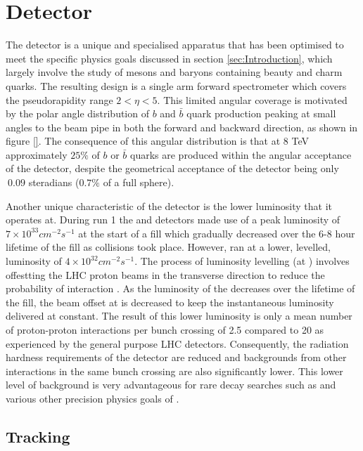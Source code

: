 
\section{Detector}
\label{sec:Detector}

The \lhcb detector is a unique and specialised apparatus that has been optimised to meet the specific physics goals discussed in section \ref{sec:Introduction}, which largely involve the study of mesons and baryons containing beauty and charm quarks.  The resulting design is a single arm forward spectrometer which covers the pseudorapidity range $2 < \eta < 5$.  This limited angular coverage is motivated by the polar angle distribution of  $b$ and $\bar{b}$ quark production peaking at small angles to the beam pipe in both the forward and backward direction, as shown in figure \ref{}.  The consequence of this angular distribution is that at 8 TeV approximately $25\%$ of $b$ or $\bar{b}$ quarks are produced within the angular acceptance of the \lhcb detector, despite the geometrical acceptance of the detector being only $~0.09$ steradians ($0.7\%$ of a full sphere).

Another unique characteristic of the \lhcb detector is the lower luminosity that it operates at.  During run 1 the \atlas and \cms detectors made use of a peak luminosity of $7\times 10^{33}cm^{-2}s^{-1}$ at the start of a fill which gradually decreased over the 6-8 hour lifetime of the fill as collisions took place.  However, \lhcb ran at a lower, levelled, luminosity of $4\times 10^{32}cm^{-2}s^{-1}$.  The process of luminosity levelling (at \lhcb) involves offestting the LHC proton beams in the transverse direction to reduce the probability of interaction \cite{Follin:2014nva}. As the luminosity of the \lhc decreases over the lifetime of the fill, the beam offset at \lhcb is decreased to keep the instantaneous luminosity delivered at \lhcb constant.  The result of this lower luminosity is only a mean number of proton-proton interactions per bunch crossing of 2.5 compared to 20 as experienced by the general purpose LHC detectors.  Consequently, the radiation hardness requirements of the \lhcb detector are reduced and backgrounds from other interactions in the same bunch crossing are also significantly lower.  This lower level of background is very advantageous for rare decay searches such as \Bz \to \muon \muon and various other precision physics goals of \lhcb.

\subsection{Tracking}
\label{sec:Tracking}




